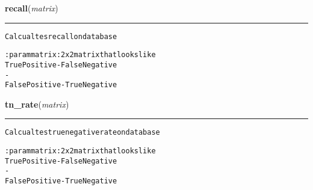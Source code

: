     \label{hal:ml:utils:misc:recall}

    \vspace{0.5ex}

\hspace{.8\funcindent}\begin{boxedminipage}{\funcwidth}

    \raggedright \textbf{recall}(\textit{matrix})

    \vspace{-1.5ex}

    \rule{\textwidth}{0.5\fboxrule}
\setlength{\parskip}{2ex}
\begin{alltt}
Calcualtes recall on database

:param matrix: 2x2 matrix that looks like
True Positive  - False Negative
     {\textbar}         -       {\textbar}
False Positive - True Negative
\end{alltt}

\setlength{\parskip}{1ex}
    \end{boxedminipage}

    \label{hal:ml:utils:misc:tn_rate}

    \vspace{0.5ex}

\hspace{.8\funcindent}\begin{boxedminipage}{\funcwidth}

    \raggedright \textbf{tn\_rate}(\textit{matrix})

    \vspace{-1.5ex}

    \rule{\textwidth}{0.5\fboxrule}
\setlength{\parskip}{2ex}
\begin{alltt}
Calcualtes true negative rate on database

:param matrix: 2x2 matrix that looks like
True Positive  - False Negative
     {\textbar}         -       {\textbar}
False Positive - True Negative
\end{alltt}

\setlength{\parskip}{1ex}
    \end{boxedminipage}

    \label{hal:ml:utils:misc:accuracy}

